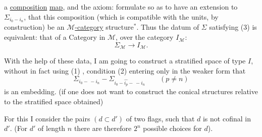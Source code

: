 a \uline{composition} \uline{map}, and the axiom:
formulate so as to have an extension 
to \(\Sigma_{i_0-i_n}\),  that this composition
(which is compatible with the units, \unsure{,|)}
by construction) be an
\uline{\(\mathcal M\)-category} structure\(^*\). 
Thus the datum of \(\Sigma\) satisfying (3)
is equivalent: that of a Category in \(\mathcal M\),
over the category \(I_{\mathcal M}\):
\[
 \Sigma_{\mathcal M}\longrightarrow I_{\mathcal M}.
\]


With the help of these data, I am going to
construct a stratified space of type \(I\),
without in fact using 
(1) , condition (2) entering
only in the weaker form that
\[
 \Sigma_{i_0-\, -i_n}
 -\Sigma_{i_0-\widehat{i_p}-\, -i_n}\qquad(p\ne n)
\]
is an embedding. 
(if one does not want to construct the conical structures
relative to the stratified space obtained)

For this I consider the pairs
 \((d\subset d')\) of two flags,
 such that
\(d\)  is not cofinal in \(d'\).
(For \(d'\) 
of length \(n\)
there are therefore \(2^n\) possible choices for \(d\)).

